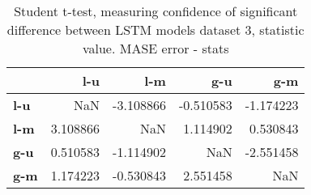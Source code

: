 \begin{table}[h]
\centering
\caption{Student t-test, measuring confidence of significant difference between LSTM models dataset 3, statistic value. MASE error - stats}
\label{table:ttest-stats-lstm-experiments-MASE-dataset-3}
\begin{tabular}{lrrrr}
\toprule
{} &       l-u &       l-m &       g-u &       g-m \\
\midrule
\textbf{l-u} &       NaN & -3.108866 & -0.510583 & -1.174223 \\
\textbf{l-m} &  3.108866 &       NaN &  1.114902 &  0.530843 \\
\textbf{g-u} &  0.510583 & -1.114902 &       NaN & -2.551458 \\
\textbf{g-m} &  1.174223 & -0.530843 &  2.551458 &       NaN \\
\bottomrule
\end{tabular}
\end{table}
